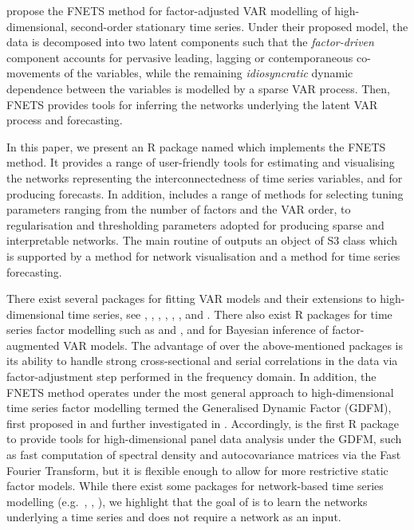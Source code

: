 \cite{barigozzi2022fnets} propose the FNETS method for factor-adjusted VAR modelling of high-dimensional, second-order stationary time series.
Under their proposed model, the data is decomposed into two latent components such that the {\it factor-driven} component accounts for pervasive leading, lagging or contemporaneous co-movements of the variables, while the remaining {\it idiosyncratic} dynamic dependence between the variables is modelled by a sparse VAR process.
Then, FNETS provides tools for inferring the networks underlying the latent VAR process and forecasting.

In this paper, we present an R package named  which implements the FNETS method.
It provides a range of user-friendly tools for estimating and visualising the networks representing the interconnectedness of time series variables, and for producing forecasts.
In addition,  includes a range of methods for selecting tuning parameters ranging from the number of factors and the VAR order, to regularisation and thresholding parameters adopted for producing sparse and interpretable networks.
The main routine of  outputs an object of S3 class  which is supported by a  method for network visualisation and a  method for time series forecasting.

There exist several packages for fitting VAR models and their extensions to high-dimensional time series, see  \citep{lsvar},  \citep{sparsevar},  \citep{nets},  \citep{haslbeck2020mgm},  \citep{epskamp2018gaussian},  \citep{nicholson2017bigvar},
and  \citep{wilms2021bigtime}.
There also exist R packages for time series factor modelling such as  \citep{dfms} and  \citep{mosley2023sparsedfm}, and  \citep{bernanke2005measuring} for Bayesian inference of factor-augmented VAR models.
The advantage of  over the above-mentioned packages is its ability to handle strong cross-sectional and serial correlations in the data via factor-adjustment step performed in the frequency domain.
In addition, the FNETS method operates under the most general approach to high-dimensional time series factor modelling termed the Generalised Dynamic Factor (GDFM), first proposed in \cite{forni2000generalized} and further investigated in \cite{forni2015dynamic}.
Accordingly,  is the first R package to provide tools for high-dimensional panel data analysis under the GDFM, such as fast computation of spectral density and autocovariance matrices via the Fast Fourier Transform, but it is flexible enough to allow for more restrictive static factor models.
While there exist some packages for network-based time series modelling (e.g.\ , \citeauthor{knight2020generalized}, \citeyear{knight2020generalized}), we highlight that the goal of  is to learn the networks underlying a time series and does not require a network as an input.

